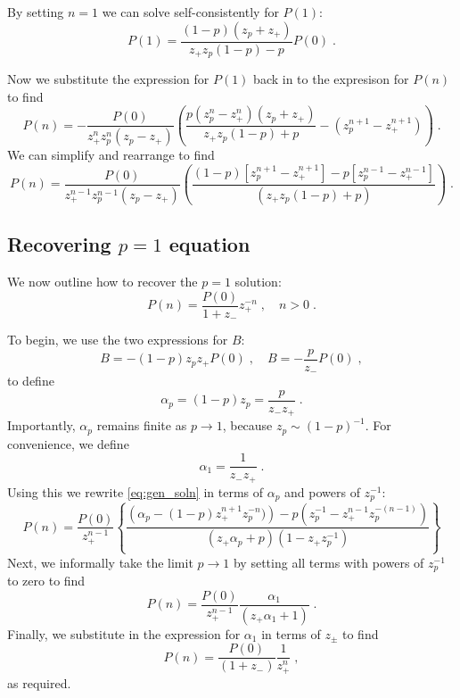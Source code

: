 \documentclass[a4paper,10pt]{article}
\begin{document}
By setting $n=1$ we can solve self-consistently for $P(1)$:
\begin{equation}
 P(1) = \frac{(1-p)(z_p + z_+)}{z_+ z_p (1-p) - p} P(0) \;.
\end{equation}

Now we substitute the expression for $P(1)$ back in to the expresison for $P(n)$ to find
\begin{equation}
  P(n) = -\frac{P(0)}{z_+^n z_p^n(z_p-z_+)} \left( \frac{p(z_p^n-z_+^n)(z_p+z_+)}{z_+z_p(1-p) + p} -(z_p^{n+1} -z_+^{n+1}) \right) \;. 
\end{equation}
We can simplify and rearrange to find
\begin{equation}\label{eq:gen_soln}
  P(n) = \frac{P(0)}{z_+^{n-1} z_p^{n-1}(z_p-z_+)} \left( \frac{ (1-p) [z_p^{n+1} - z_+^{n+1}] - p[  z_p^{n-1} - z_+^{n-1}]}{(z_+z_p(1-p) + p)} \right) \;. 
\end{equation}

\subsection{Recovering $p=1$ equation}

We now outline how to recover the $p=1$ solution:
\begin{equation}
 P(n) = \frac{P(0)}{1+z_-} z_+^{-n} \;, \quad n > 0 \;.
\end{equation}

To begin, we use the two expressions for $B$:
\begin{equation}
  B = -(1-p)z_pz_+P(0) \;, \quad B = -\frac{p}{z_-}P(0) \;,
\end{equation}
to define
\begin{equation}
  \alpha_p = (1-p)z_p = \frac{p}{z_-z_+} \;.
\end{equation}
Importantly, $\alpha_p$ remains finite as $p\to 1$, because $z_p \sim (1-p)^{-1}$. For convenience, we define
\begin{equation}
  \alpha_1 = \frac{1}{z_-z_+} \;.
\end{equation}
Using this we rewrite \eqref{eq:gen_soln} in terms of $\alpha_p$ and powers of $z_p^{-1}$:
\begin{equation}
 P(n) = \frac{P(0)}{z_+^{n-1}} \left\{
                                \frac
                                {
                                  \left( \alpha_p - (1-p)z_+^{n+1}z_p^{-n}) \right) - p \left( z_p^{-1} - z_+^{n-1}z_p^{-(n-1)} \right)
                                }
                                {
                                  \left( z_+ \alpha_p + p \right) \left( 1 - z_+ z_p^{-1} \right)
                                }
                               \right\}
\end{equation}
Next, we informally take the limit $p\to1$ by setting all terms with powers of $z_p^{-1}$ to zero to find
\begin{equation}
  P(n) = \frac{P(0)}{z_+^{n-1}} \frac{\alpha_1}{(z_+ \alpha_1 + 1)} \;.
\end{equation}
Finally, we substitute in the expression for $\alpha_1$ in terms of $z_\pm$ to find
\begin{equation}
  P(n) = \frac{P(0)}{(1+z_-)} \frac{1}{z_+^n} \;,
\end{equation}
as required.
\end{document}
